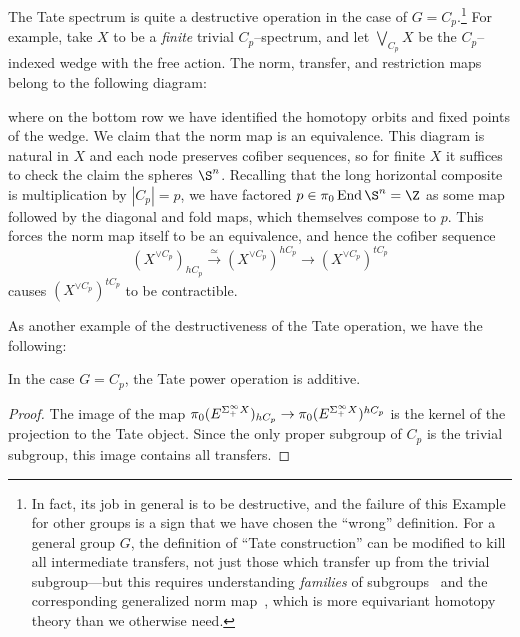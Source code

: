 \begin{example}\label{TateDestruction}
The Tate spectrum is quite a destructive operation in the case of \(G = C_p\).\footnote{In fact, its job in general is to be destructive, and the failure of this Example for other groups is a sign that we have chosen the ``wrong'' definition.  For a general group \(G\), the definition of ``Tate construction'' can be modified to kill all intermediate transfers, not just those which transfer up from the trivial subgroup---but this requires understanding \textit{families} of subgroups~\cite[Section XXI.4]{MayAlaskaNotes} and the corresponding generalized norm map~\cite[Section XXV.6]{MayAlaskaNotes}, which is more equivariant homotopy theory than we otherwise need.}  For example, take \(X\) to be a \emph{finite} trivial \(C_p\)--spectrum, and let \(\bigvee_{C_p} X\) be the \(C_p\)--indexed wedge with the free action.  The norm, transfer, and restriction maps belong to the following diagram:
\begin{center}
\end{center}
where on the bottom row we have identified the homotopy orbits and fixed points of the wedge.  We claim that the norm map is an equivalence.  This diagram is natural in \(X\) and each node preserves cofiber sequences, so for finite \(X\) it suffices to check the claim the spheres \(\S^n\).  Recalling that the long horizontal composite is multiplication by \(|C_p| = p\), we have factored \(p \in \pi_0 \End \S^n = \Z\) as some map followed by the diagonal and fold maps, which themselves compose to \(p\).  This forces the norm map itself to be an equivalence, and hence the cofiber sequence \[(X^{\vee C_p})_{hC_p} \xrightarrow{\simeq} (X^{\vee C_p})^{hC_p} \to (X^{\vee C_p})^{tC_p}\] causes \((X^{\vee C_p})^{tC_p}\) to be contractible.
\end{example}

As another example of the destructiveness of the Tate operation, we have the following:

\begin{lemma}
In the case \(G = C_p\), the Tate power operation is additive.
\end{lemma}
\begin{proof}
The image of the map \(\pi_0 (E^{\Sigma^\infty_+ X})_{hC_p} \to \pi_0 (E^{\Sigma^\infty_+ X})^{hC_p}\) is the kernel of the projection to the Tate object.  Since the only proper subgroup of \(C_p\) is the trivial subgroup, this image contains all transfers.
\end{proof}

